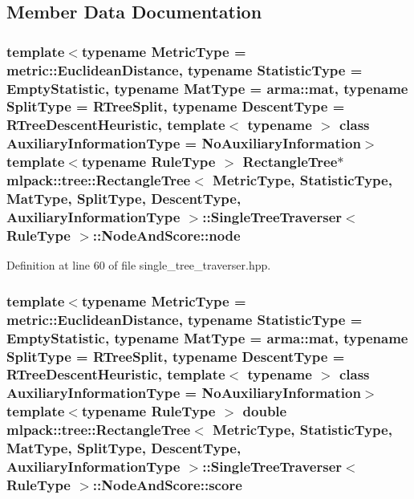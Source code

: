 \subsection{Member Data Documentation}
\subsubsection[{node}]{\setlength{\rightskip}{0pt plus 5cm}template$<$typename Metric\+Type  = metric\+::\+Euclidean\+Distance, typename Statistic\+Type  = Empty\+Statistic, typename Mat\+Type  = arma\+::mat, typename Split\+Type  = R\+Tree\+Split, typename Descent\+Type  = R\+Tree\+Descent\+Heuristic, template$<$ typename $>$ class Auxiliary\+Information\+Type = No\+Auxiliary\+Information$>$ template$<$typename Rule\+Type $>$ {\bf Rectangle\+Tree}$\ast$ {\bf mlpack\+::tree\+::\+Rectangle\+Tree}$<$ Metric\+Type, Statistic\+Type, Mat\+Type, {\bf Split\+Type}, {\bf Descent\+Type}, Auxiliary\+Information\+Type $>$\+::{\bf Single\+Tree\+Traverser}$<$ Rule\+Type $>$\+::Node\+And\+Score\+::node}\label{structmlpack_1_1tree_1_1RectangleTree_1_1SingleTreeTraverser_1_1NodeAndScore_ac5c95e3f3fa1e57bd291a513590ca02b}


Definition at line 60 of file single\+\_\+tree\+\_\+traverser.\+hpp.

\subsubsection[{score}]{\setlength{\rightskip}{0pt plus 5cm}template$<$typename Metric\+Type  = metric\+::\+Euclidean\+Distance, typename Statistic\+Type  = Empty\+Statistic, typename Mat\+Type  = arma\+::mat, typename Split\+Type  = R\+Tree\+Split, typename Descent\+Type  = R\+Tree\+Descent\+Heuristic, template$<$ typename $>$ class Auxiliary\+Information\+Type = No\+Auxiliary\+Information$>$ template$<$typename Rule\+Type $>$ double {\bf mlpack\+::tree\+::\+Rectangle\+Tree}$<$ Metric\+Type, Statistic\+Type, Mat\+Type, {\bf Split\+Type}, {\bf Descent\+Type}, Auxiliary\+Information\+Type $>$\+::{\bf Single\+Tree\+Traverser}$<$ Rule\+Type $>$\+::Node\+And\+Score\+::score}\label{structmlpack_1_1tree_1_1RectangleTree_1_1SingleTreeTraverser_1_1NodeAndScore_a222b51e691eddeede0a778929c63de7a}


